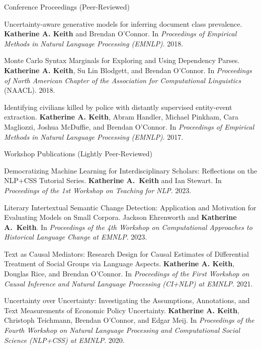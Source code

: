 \documentclass{resume} %
\begin{document}
\begin{rSection}{Conference Proceedings (Peer-Reviewed)}
\begin{etaremune}
\item Uncertainty-aware generative models for inferring document class prevalence.
\textbf{Katherine A. Keith} and Brendan O'Connor. 
In \emph{Proceedings of Empirical Methods in Natural Language Processing (EMNLP)}. 2018. 

\item Monte Carlo Syntax Marginals for Exploring and Using Dependency Parses.
\textbf{Katherine A. Keith}, Su Lin Blodgett, and Brendan O'Connor.
In \emph{Proceedings of North American Chapter of the Association for Computational Linguistics} (NAACL). 2018.

\item Identifying civilians killed by police with distantly supervised entity-event extraction. 
\textbf{Katherine A. Keith}, Abram Handler, Michael Pinkham, Cara Magliozzi, Joshua McDuffie, and Brendan O'Connor. In \emph{Proceedings of Empirical Methods in Natural Language Processing (EMNLP)}. 2017. 

\end{etaremune}
\end{rSection}

\begin{rSection}{Workshop Publications (Lightly Peer-Reviewed)}
\begin{etaremune}

\item Democratizing Machine Learning for Interdisciplinary Scholars:
Reflections on the NLP+CSS Tutorial Series. 
\textbf{Katherine A.~Keith} and Ian Stewart. 
In \emph{Proceedings of the 1st Workshop on Teaching for NLP}. 2023. 

\item Literary Intertextual Semantic Change Detection:
Application and Motivation for Evaluating Models on Small Corpora.
Jackson Ehrenworth and \textbf{Katherine A.~Keith}. 
In \emph{Proceedings of the 4th Workshop on Computational Approaches to Historical Language Change at EMNLP}. 2023. 


\item Text as Causal Mediators: Research Design for Causal Estimates of Differential Treatment of Social Groups via Language Aspects. \textbf{Katherine A. Keith}, Douglas Rice, and Brendan O'Connor. In \emph{Proceedings of the First Workshop on Causal Inference and Natural Language Processing (CI+NLP) at EMNLP}. 2021.  

\item Uncertainty over Uncertainty: Investigating the Assumptions, Annotations, and Text Measurements of Economic Policy Uncertainty. \textbf{Katherine A. Keith}, Christoph Teichmann, Brendan O’Connor, and Edgar Meij.  In \emph{Proceedings of the Fourth Workshop on Natural Language Processing and Computational Social Science (NLP+CSS) at EMNLP}. 2020.

\end{etaremune}
\end{rSection}
\end{document}
